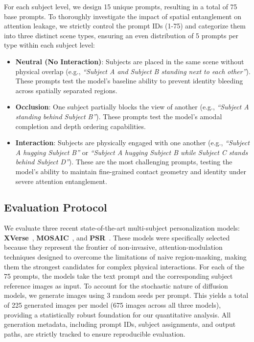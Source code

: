 For each subject level, we design 15 unique prompts, resulting in a total of 75 base prompts. To thoroughly investigate the impact of spatial entanglement on attention leakage, we strictly control the prompt IDs (1-75) and categorize them into three distinct scene types, ensuring an even distribution of 5 prompts per type within each subject level:
\begin{itemize}
    \item \textbf{Neutral (No Interaction)}: Subjects are placed in the same scene without physical overlap (e.g., \textit{``Subject A and Subject B standing next to each other''}). These prompts test the model's baseline ability to prevent identity bleeding across spatially separated regions.
    \item \textbf{Occlusion}: One subject partially blocks the view of another (e.g., \textit{``Subject A standing behind Subject B''}). These prompts test the model's amodal completion and depth ordering capabilities.
    \item \textbf{Interaction}: Subjects are physically engaged with one another (e.g., \textit{``Subject A hugging Subject B''} or \textit{``Subject A hugging Subject B while Subject C stands behind Subject D''}). These are the most challenging prompts, testing the model's ability to maintain fine-grained contact geometry and identity under severe attention entanglement.
\end{itemize}

\subsection{Evaluation Protocol}
We evaluate three recent state-of-the-art multi-subject personalization models: \textbf{XVerse}~\cite{xverse2024}, \textbf{MOSAIC}~\cite{mosaic2024}, and \textbf{PSR}~\cite{psr2024}. These models were specifically selected because they represent the frontier of non-invasive, attention-modulation techniques designed to overcome the limitations of naive region-masking, making them the strongest candidates for complex physical interactions. For each of the 75 prompts, the models take the text prompt and the corresponding subject reference images as input. To account for the stochastic nature of diffusion models, we generate images using 3 random seeds per prompt. This yields a total of 225 generated images per model (675 images across all three models), providing a statistically robust foundation for our quantitative analysis. All generation metadata, including prompt IDs, subject assignments, and output paths, are strictly tracked to ensure reproducible evaluation.
